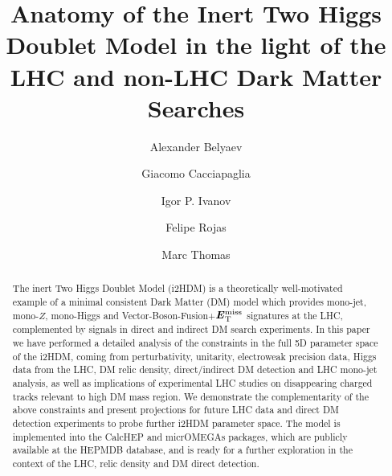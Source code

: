 \documentclass[12pt,a4paper]{article}
\renewcommand{\topfraction}{1.0}
\renewcommand{\bottomfraction}{1.0}
\renewcommand{\textfraction}{0.0}
\newcommand{\MET}{\textbf{\textit{E}$_{\rm T}^{\rm miss}$}}
\begin{document}
\renewcommand{\topfraction}{1.0}
\renewcommand{\bottomfraction}{1.0}
\renewcommand{\textfraction}{0.0}

\title{Anatomy of the Inert Two Higgs Doublet Model in the light of the LHC and non-LHC Dark Matter Searches}

\author[1,2]{Alexander Belyaev}
\author[3]{Giacomo Cacciapaglia}
\author[4]{Igor P. Ivanov}
\author[2,5]{Felipe Rojas}
\author[1,2]{Marc Thomas}


\maketitle
\vspace{0.8cm}
\begin{abstract}
The inert Two Higgs Doublet Model (i2HDM) is a theoretically well-motivated  example  of a
minimal consistent Dark Matter (DM)  model  which provides mono-jet, mono-$Z$, mono-Higgs and
Vector-Boson-Fusion+$\MET{}$ signatures at the LHC, complemented by signals in direct and
indirect DM search experiments. In this paper we have performed a detailed analysis of the  
constraints in the full 5D  parameter space of the i2HDM, coming from perturbativity, unitarity, electroweak
precision data, Higgs data from the LHC, DM relic density, direct/indirect DM detection and LHC
mono-jet analysis, as well as  implications of experimental LHC studies on disappearing charged
tracks relevant to high DM mass region. We demonstrate the complementarity of the above
constraints and present projections for future LHC data and direct DM detection
experiments to probe further i2HDM parameter space. The model is implemented into the CalcHEP and
micrOMEGAs packages, which are publicly available at the HEPMDB database, and is ready for a further
exploration in the context of the LHC, relic density and DM direct detection.


\end{abstract}

\newpage
\tableofcontents
\newpage


%
\end{document}
